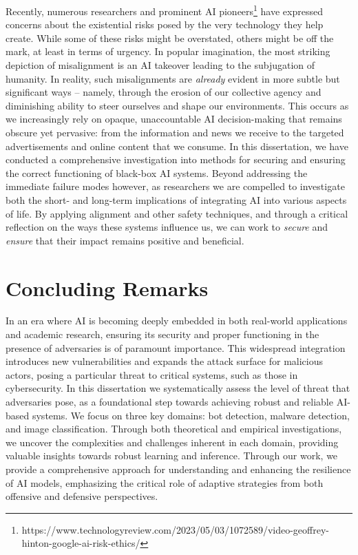 Recently, numerous researchers and prominent \gls{AI} pioneers\footnote{https://www.technologyreview.com/2023/05/03/1072589/video-geoffrey-hinton-google-ai-risk-ethics/} have expressed concerns about the existential risks posed by the very technology they help create.
While some of these risks might be overstated, others might be off the mark, at least in terms of urgency.
In popular imagination, the most striking depiction of misalignment is an \gls{AI} takeover leading to the subjugation of humanity.
In reality, such misalignments are \textit{already} evident in more subtle but significant ways -- namely, through the erosion of our collective agency and diminishing ability to steer ourselves and shape our environments.
This occurs as we increasingly rely on opaque, unaccountable \gls{AI} decision-making that remains obscure yet pervasive: from the information and news we receive to the targeted advertisements and online content that we consume.
In this dissertation, we have conducted a comprehensive investigation into methods for securing and ensuring the correct functioning of black-box \gls{AI} systems.
Beyond addressing the immediate failure modes however, as researchers we are compelled to investigate both the short- and long-term implications of integrating \gls{AI} into various aspects of life.
By applying alignment and other safety techniques, and through a critical reflection on the ways these systems influence us, we can work to \textit{secure} and \textit{ensure} that their impact remains positive and beneficial.

\section{Concluding Remarks}

In an era where \gls{AI} is becoming deeply embedded in both real-world applications and academic research, ensuring its security and proper functioning in the presence of adversaries is of paramount importance.
This widespread integration introduces new vulnerabilities and expands the attack surface for malicious actors, posing a particular threat to critical systems, such as those in cybersecurity.
In this dissertation we systematically assess the level of threat that adversaries pose, as a foundational step towards achieving robust and reliable AI-based systems.
We focus on three key domains: bot detection, malware detection, and image classification.
Through both theoretical and empirical investigations, we uncover the complexities and challenges inherent in each domain, providing valuable insights towards robust learning and inference.
Through our work, we provide a comprehensive approach for understanding and enhancing the resilience of AI models, emphasizing the critical role of adaptive strategies from both offensive and defensive perspectives.

